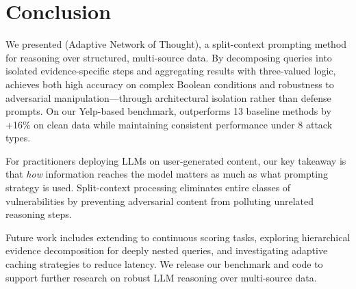 \section{Conclusion}

We presented \method (Adaptive Network of Thought), a split-context prompting method for reasoning over structured, multi-source data.
By decomposing queries into isolated evidence-specific steps and aggregating results with three-valued logic, \method achieves both high accuracy on complex Boolean conditions and robustness to adversarial manipulation---through architectural isolation rather than defense prompts.
On our Yelp-based benchmark, \method outperforms 13 baseline methods by +16\% on clean data while maintaining consistent performance under 8 attack types.

For practitioners deploying LLMs on user-generated content, our key takeaway is that \emph{how} information reaches the model matters as much as what prompting strategy is used.
Split-context processing eliminates entire classes of vulnerabilities by preventing adversarial content from polluting unrelated reasoning steps.

Future work includes extending \method to continuous scoring tasks, exploring hierarchical evidence decomposition for deeply nested queries, and investigating adaptive caching strategies to reduce latency.
We release our benchmark and code to support further research on robust LLM reasoning over multi-source data.
